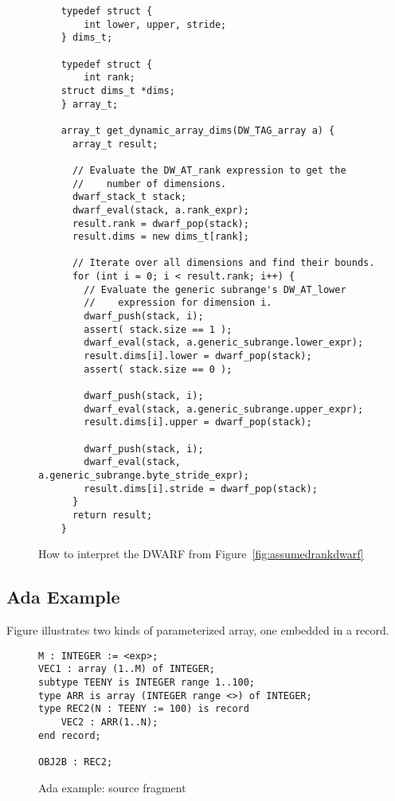 \begin{figure}[!h]
\begin{lstlisting}
    typedef struct {
        int lower, upper, stride;
    } dims_t;

    typedef struct {
        int rank;
    struct dims_t *dims;
    } array_t;

    array_t get_dynamic_array_dims(DW_TAG_array a) {
      array_t result;

      // Evaluate the DW_AT_rank expression to get the 
      //    number of dimensions.
      dwarf_stack_t stack;
      dwarf_eval(stack, a.rank_expr);
      result.rank = dwarf_pop(stack); 
      result.dims = new dims_t[rank];

      // Iterate over all dimensions and find their bounds.
      for (int i = 0; i < result.rank; i++) {
        // Evaluate the generic subrange's DW_AT_lower 
        //    expression for dimension i.
        dwarf_push(stack, i);
        assert( stack.size == 1 );
        dwarf_eval(stack, a.generic_subrange.lower_expr);
        result.dims[i].lower = dwarf_pop(stack);
        assert( stack.size == 0 );

        dwarf_push(stack, i);
        dwarf_eval(stack, a.generic_subrange.upper_expr);
        result.dims[i].upper = dwarf_pop(stack);
    
        dwarf_push(stack, i);
        dwarf_eval(stack, a.generic_subrange.byte_stride_expr);
        result.dims[i].stride = dwarf_pop(stack);
      }
      return result;
    }
\end{lstlisting}
\caption{How to interpret the DWARF from Figure~\ref{fig:assumedrankdwarf}}
\label{fig:assumedrankdwarfparser}
\end{figure}



\clearpage
\subsection{Ada Example}
\label{app:adaexample}
Figure 
illustrates two kinds of  
parameterized array, one embedded in a record.

\begin{figure}[here]
\begin{lstlisting}
M : INTEGER := <exp>;
VEC1 : array (1..M) of INTEGER;
subtype TEENY is INTEGER range 1..100;
type ARR is array (INTEGER range <>) of INTEGER;
type REC2(N : TEENY := 100) is record
    VEC2 : ARR(1..N);
end record;

OBJ2B : REC2;
\end{lstlisting}
\caption{Ada example: source fragment}
\label{fig:adaexamplesourcefragment}
\end{figure}

